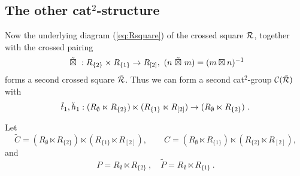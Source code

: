 \vspace*{5mm} 
\subsection{The other cat$^2$-structure}

Now the underlying diagram (\ref{eq:Rsquare}) of the crossed square $\mathcal{R}$, 
together with the crossed pairing 
$$
\btt : R_{\{2\}} \times R_{\{1\}} \to R_{[2]}, \ 
               (n \btt m) = (m \bt n)^{-1}
$$
forms a second crossed square $\tilde{\mathcal{R}}$. 
Thus we can form a second cat$^2$-group $\mathcal{C}(\tilde{\mathcal{R}})$ with 
$$
\ddot{t}_1, \ddot{h}_1 : (R_{\emptyset} \ltimes R_{\{2\}}) \ltimes (R_{\{1\}} 
            \ltimes R_{[2]}) \to (R_{\emptyset} \ltimes R_{\{2\}})~.
$$

Let
$$
\tilde{C} = (R_{\emptyset} \ltimes R_{\{2\}}) \ltimes (R_{\{1\}} 
       \ltimes R_{[2]}), \qquad
C = (R_{\emptyset} \ltimes R_{\{1\}}) \ltimes (R_{\{2\}} \ltimes R_{[2]}),
$$
and
$$
P  = R_{\emptyset} \ltimes R_{\{2\}}~, \quad 
\tilde{P} = R_{\emptyset} \ltimes R_{\{1\}}~.
$$


